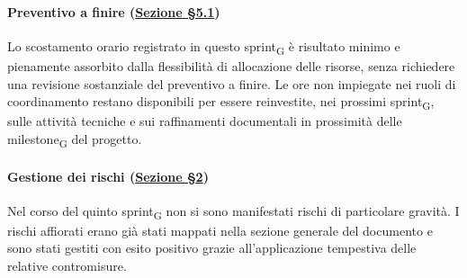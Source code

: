 \documentclass[a4paper, 10pt, colorlinks=true, linkcolor=black, urlcolor=blue, citecolor=blue, hidelinks]{article}
\begin{document}
\paragraph{Preventivo a finire (\hyperref[tab:preventivo-finire]{Sezione \S5.1})}
Lo scostamento orario registrato in questo sprint\textsubscript{G} è risultato minimo e pienamente assorbito dalla flessibilità di allocazione delle risorse, senza richiedere una revisione sostanziale del preventivo a finire. Le ore non impiegate nei ruoli di coordinamento restano disponibili per essere reinvestite, nei prossimi sprint\textsubscript{G}, sulle attività tecniche e sui raffinamenti documentali in prossimità delle milestone\textsubscript{G} del progetto.

\paragraph{Gestione dei rischi (\hyperref[tab:gestione-rischi]{Sezione \S2})}
Nel corso del quinto sprint\textsubscript{G} non si sono manifestati rischi di particolare gravità. I rischi affiorati erano già stati mappati nella sezione generale del documento e sono stati gestiti con esito positivo grazie all'applicazione tempestiva delle relative contromisure.
\end{document}
